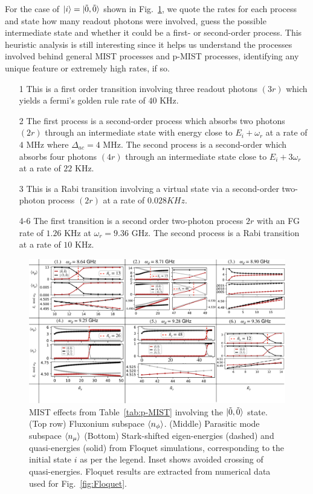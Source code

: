 \documentclass[%
reprint,
superscriptaddress,
 amsmath,amssymb,
 aps,
 prx,
longbibliography,
floatfix,
]{revtex4-2}
\begin{document}
For the case of $\ket{i}=\ket{\tilde{0},\tilde{0}}$ shown in Fig.~\ref{fig:Trans0}, we quote the rates for each process and state how many readout photons were involved, guess the possible intermediate state and whether it could be a first- or second-order process. This heuristic analysis is still interesting since it helps us understand the processes involved behind general MIST processes and p-MIST processes, identifying any unique feature or extremely high rates, if so. 
\begin{itemize}
    \item[1] This is a first order transition involving three readout photons $(3r)$ which yields a fermi's golden rule rate of $40$ KHz. 
    \item[2] The first process is a second-order process which absorbs two photons $(2r)$ through an intermediate state with energy close to $E_i+\omega_r$ at a rate of $4$ MHz where $\Delta_{ac}=4$ MHz. The second process is a second-order which absorbs four photons $(4r)$ through an intermediate state close to $E_i+3\omega_r$ at a rate of $22$ KHz. 
    \item[3] This is a Rabi transition involving a virtual state via a second-order two-photon process $(2r)$ at a rate of $0.028 KHz$. 
    \item[4-6] The first transition is a second order two-photon process $2r$ with an FG rate of $1.26$ KHz at $\omega_r=9.36$ GHz. The second process is a Rabi transition at a rate of $10$ KHz. 
\end{itemize} 
\begin{figure}
    \centering
    \includegraphics[width=1.0\textwidth]{Figures/Trans0.pdf}
    \caption{MIST effects from Table~\ref{tab:p-MIST} involving the $\ket{\tilde{0},\tilde{0}}$ state. (Top row) Fluxonium subspace $\braket{n_\phi}$. (Middle) Parasitic mode subspace $\braket{n_\mu}$ (Bottom) Stark-shifted eigen-energies (dashed) and quasi-energies (solid) from Floquet simulations, corresponding to the initial state $i$ as per the legend. Inset shows avoided crossing of quasi-energies. Floquet results are extracted from numerical data used for Fig.~\ref{fig:Floquet}.}
    \label{fig:Trans0}
\end{figure}
\end{document}
